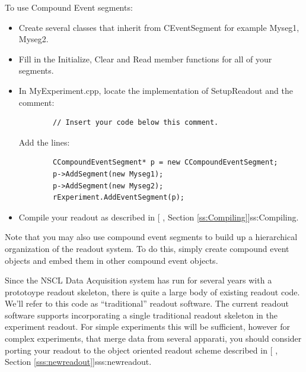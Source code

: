    To use Compound Event segments:
   \begin{itemize}
      \item Create several classes that inherit from CEventSegment
	 for example Myseg1, Myseg2.
      \item Fill in the Initialize, Clear and Read member
	 functions for all of your segments.
      \item In MyExperiment.cpp, locate the implementation of 
	    SetupReadout and the comment:
	    \begin{verbatim}
	    // Insert your code below this comment.
	    \end{verbatim}
	    Add the lines:
	    \begin{verbatim}
	    CCompoundEventSegment* p = new CCompoundEventSegment;
	    p->AddSegment(new Myseg1);
	    p->AddSegment(new Myseg2);
	    rExperiment.AddEventSegment(p);
	    \end{verbatim}
      \item Compile your readout as described in 
	    [
	    , Section \ref{ss:Compiling}]{ss:Compiling}.   
   \end{itemize}
   
      Note that you may also use compound event segments to build
   up a hierarchical organization of the readout system.  To do this,
   simply create compound event objects and embed them in other compound
   event objects.

   Since the NSCL Data Acquisition system has run for several years with
   a prototoype readout skeleton, there is quite a large body of existing
   readout code.  We'll refer to this code as ``traditional'' readout software.
   The current readout software supports incorporating a single traditional
   readout skeleton in the experiment readout.  For simple experiments this 
   will be sufficient, however for complex experiments, that merge data from
   several apparati, you should consider porting your readout to the object
   oriented readout scheme described in [
   , Section \ref{sss:newreadout}]{sss:newreadout}.
   

